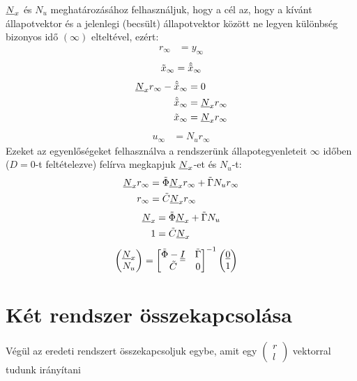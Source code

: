\documentclass{article}
\begin{document}
    $\underline{N}_x$ és $N_u$ meghatározásához felhasználjuk, hogy a cél az, hogy a kívánt állapotvektor és a jelenlegi (becsült) állapotvektor között ne legyen különbség bizonyos idő $(\infty)$ elteltével, ezért:
    \begin{align}
        r_\infty & = y_\infty
    \end{align}
    \begin{align}
        \tilde{x}_\infty = \hat{\tilde{x}}_\infty
    \end{align}
    \begin{align}
        \underline{N}_x r_\infty - \hat{\tilde{x}}_\infty & = 0 \\
        \hat{\tilde{x}}_\infty & = \underline{N}_x r_\infty \\
        \tilde{x}_\infty & = \underline{N}_x r_\infty
    \end{align}
    \begin{align}
        u_\infty & = N_u r_\infty
    \end{align}
    Ezeket az egyenlőségeket felhasználva a rendszerünk állapotegyenleteit $\infty$ időben ($D = 0$-t feltételezve) felírva megkapjuk $\underline{N}_x$-et és $N_u$-t:
    \begin{align}
        \underline{N}_x r_\infty & = \tilde{\Phi} \underline{N}_x r_\infty + \tilde{\Gamma} N_u r_\infty \\
        r_\infty & = \tilde{C} \underline{N}_x r_\infty
    \end{align}
    \begin{align}
        \underline{N}_x & = \tilde{\Phi} \underline{N}_x + \tilde{\Gamma} N_u \\
        1 & = \tilde{C} \underline{N}_x
    \end{align}
    \begin{align}
        \begin{pmatrix}
            \underline{N}_x \\
            N_u
        \end{pmatrix} & =
        \begin{bmatrix}
            \tilde{\Phi} - \underline{\underline{I}} & \tilde{\Gamma} \\
            \tilde{C}          & 0
        \end{bmatrix}^{-1}
        \begin{pmatrix}
            \underline{0} \\
            1
        \end{pmatrix}
    \end{align}
    
\section{Két rendszer összekapcsolása}
    Végül az eredeti rendszert összekapcsoljuk egybe, amit egy $\left(\begin{smallmatrix}r \\ l\end{smallmatrix}\right)$ vektorral tudunk irányítani
\end{document}
